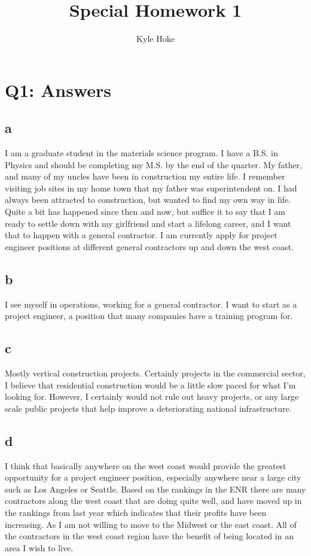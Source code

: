 \documentclass[12pt]{article} %
\title{Special Homework 1}
\author{Kyle Hoke}
\begin{document}
\maketitle

\section{Q1: Answers}

	\subsection{a}
		I am a graduate student in the materials science program. I have a B.S. in Physics and should be completing my M.S. by the end of the quarter. My father, and many of my uncles have been in construction my entire life. I remember visiting job sites in my home town that my father was superintendent on. I had always been attracted to construction, but wanted to find my own way in life. Quite a bit has happened since then and now, but suffice it to say that I am ready to settle down with my girlfriend and start a lifelong career, and I want that to happen with a general contractor. I am currently apply for project engineer positions at different general contractors up and down the west coast.

	\subsection{b}
		I see myself in operations, working for a general contractor. I want to start as a project engineer, a position that many companies have a training program for. 

	\subsection{c}
		Mostly vertical construction projects. Certainly projects in the commercial sector, I believe that residential construction would be a little slow paced for what I’m looking for. However, I certainly would not rule out heavy projects, or any large scale public projects that help improve a deteriorating national infrastructure.

	\subsection{d}
		I think that basically anywhere on the west coast would provide the greatest opportunity for a project engineer position, especially anywhere near a large city such as Los Angeles or Seattle. Based on the rankings in the ENR there are many contractors along the west coast that are doing quite well, and have moved up in the rankings from last year which indicates that their profits have been increasing. As I am not willing to move to the Midwest or the east coast. All of the contractors in the west coast region have the benefit of being located in an area I wish to live. 
	
\end{document}
